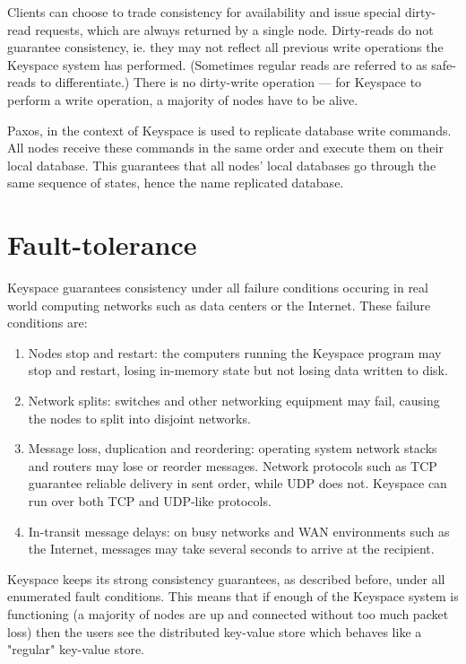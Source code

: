 \documentclass[12pt]{article}
\begin{document}
Clients can choose to trade consistency for availability and issue special dirty-read requests, which are always returned by a single node. Dirty-reads do not guarantee consistency, ie. they may not reflect all previous write operations the Keyspace system has performed. (Sometimes regular reads are referred to as safe-reads to differentiate.) There is no dirty-write operation --- for Keyspace to perform a write operation, a majority of nodes have to be alive.

Paxos, in the context of Keyspace is used to replicate database write commands. All nodes receive these commands in the same order and execute them on their local database. This guarantees that all nodes' local databases go through the same sequence of states, hence the name replicated database.

\section{ Fault-tolerance }

Keyspace guarantees consistency under all failure conditions occuring in real world computing networks such as data centers or the Internet. These failure conditions are:

\begin{enumerate}
\item Nodes stop and restart: the computers running the Keyspace program may stop and restart, losing in-memory state but not losing data written to disk.
\item Network splits: switches and other networking equipment may fail, causing the nodes to split into disjoint networks.
\item Message loss, duplication and reordering: operating system network stacks and routers may lose or reorder messages. Network protocols such as TCP guarantee reliable delivery in sent order, while UDP does not. Keyspace can run over both TCP and UDP-like protocols.
\item In-transit message delays: on busy networks and WAN environments such as the Internet, messages may take several seconds to arrive at the recipient.
\end{enumerate}

Keyspace keeps its strong consistency guarantees, as described before, under all enumerated fault conditions. This means that if enough of the Keyspace system is functioning (a majority of nodes are up and connected without too much packet loss) then the users see the distributed key-value store which behaves like a "regular" key-value store.
\end{document}
